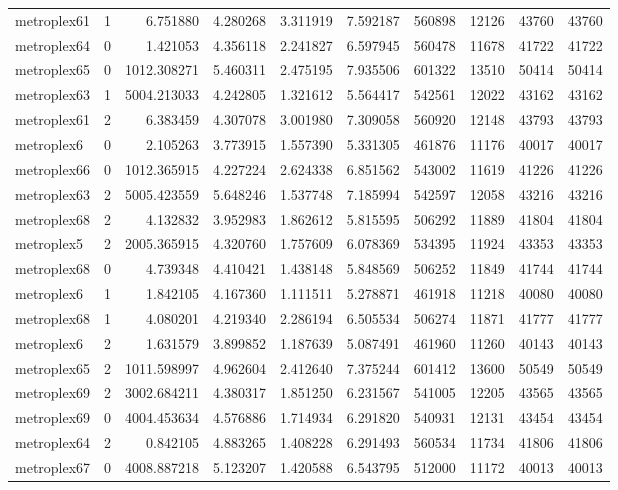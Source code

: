 \begin{longtable}{|l|r|r|r|r|r|r|r|r|r|}
metroplex61 & 1 & 6.751880 & 4.280268 & 3.311919 & 7.592187 & 560898 & 12126 & 43760 & 43760 \\
metroplex64 & 0 & 1.421053 & 4.356118 & 2.241827 & 6.597945 & 560478 & 11678 & 41722 & 41722 \\
metroplex65 & 0 & 1012.308271 & 5.460311 & 2.475195 & 7.935506 & 601322 & 13510 & 50414 & 50414 \\
metroplex63 & 1 & 5004.213033 & 4.242805 & 1.321612 & 5.564417 & 542561 & 12022 & 43162 & 43162 \\
metroplex61 & 2 & 6.383459 & 4.307078 & 3.001980 & 7.309058 & 560920 & 12148 & 43793 & 43793 \\
metroplex6 & 0 & 2.105263 & 3.773915 & 1.557390 & 5.331305 & 461876 & 11176 & 40017 & 40017 \\
metroplex66 & 0 & 1012.365915 & 4.227224 & 2.624338 & 6.851562 & 543002 & 11619 & 41226 & 41226 \\
metroplex63 & 2 & 5005.423559 & 5.648246 & 1.537748 & 7.185994 & 542597 & 12058 & 43216 & 43216 \\
metroplex68 & 2 & 4.132832 & 3.952983 & 1.862612 & 5.815595 & 506292 & 11889 & 41804 & 41804 \\
metroplex5 & 2 & 2005.365915 & 4.320760 & 1.757609 & 6.078369 & 534395 & 11924 & 43353 & 43353 \\
metroplex68 & 0 & 4.739348 & 4.410421 & 1.438148 & 5.848569 & 506252 & 11849 & 41744 & 41744 \\
metroplex6 & 1 & 1.842105 & 4.167360 & 1.111511 & 5.278871 & 461918 & 11218 & 40080 & 40080 \\
metroplex68 & 1 & 4.080201 & 4.219340 & 2.286194 & 6.505534 & 506274 & 11871 & 41777 & 41777 \\
metroplex6 & 2 & 1.631579 & 3.899852 & 1.187639 & 5.087491 & 461960 & 11260 & 40143 & 40143 \\
metroplex65 & 2 & 1011.598997 & 4.962604 & 2.412640 & 7.375244 & 601412 & 13600 & 50549 & 50549 \\
metroplex69 & 2 & 3002.684211 & 4.380317 & 1.851250 & 6.231567 & 541005 & 12205 & 43565 & 43565 \\
metroplex69 & 0 & 4004.453634 & 4.576886 & 1.714934 & 6.291820 & 540931 & 12131 & 43454 & 43454 \\
metroplex64 & 2 & 0.842105 & 4.883265 & 1.408228 & 6.291493 & 560534 & 11734 & 41806 & 41806 \\
metroplex67 & 0 & 4008.887218 & 5.123207 & 1.420588 & 6.543795 & 512000 & 11172 & 40013 & 40013 \\

\end{longtable}
